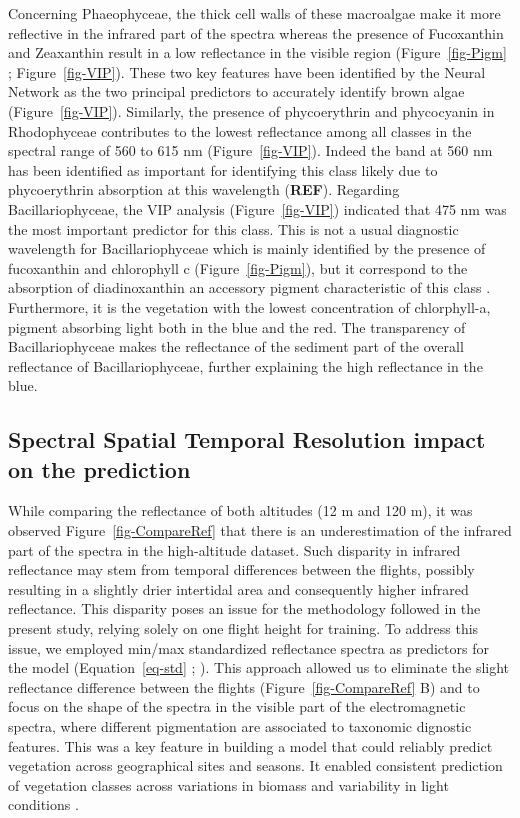 \documentclass[
  number]{elsarticle}
\begin{document}
Concerning Phaeophyceae, the thick cell walls of these macroalgae
\citep{charrier2021growth} make it more reflective in the infrared part
of the spectra \citep{Slaton2001} whereas the presence of Fucoxanthin
and Zeaxanthin result in a low reflectance in the visible region
(Figure~\ref{fig-Pigm} ; Figure~\ref{fig-VIP}). These two key features
have been identified by the Neural Network as the two principal
predictors to accurately identify brown algae (Figure~\ref{fig-VIP}).
Similarly, the presence of phycoerythrin and phycocyanin in Rhodophyceae
contributes to the lowest reflectance among all classes in the spectral
range of 560 to 615 nm (Figure~\ref{fig-VIP}). Indeed the band at 560 nm
has been identified as important for identifying this class likely due
to phycoerythrin absorption at this wavelength (\textbf{REF}). Regarding
Bacillariophyceae, the VIP analysis (Figure~\ref{fig-VIP}) indicated
that 475 nm was the most important predictor for this class. This is not
a usual diagnostic wavelength for Bacillariophyceae which is mainly
identified by the presence of fucoxanthin and chlorophyll c
(Figure~\ref{fig-Pigm}), but it correspond to the absorption of
diadinoxanthin an accessory pigment characteristic of this class
\citep{meleder2003spectrometric}. Furthermore, it is the vegetation with
the lowest concentration of chlorphyll-a, pigment absorbing light both
in the blue and the red. The transparency of Bacillariophyceae makes the
reflectance of the sediment part of the overall reflectance of
Bacillariophyceae, further explaining the high reflectance in the blue.

\subsection{Spectral Spatial Temporal Resolution impact on the
prediction}\label{spectral-spatial-temporal-resolution-impact-on-the-prediction}

While comparing the reflectance of both altitudes (12 m and 120 m), it
was observed Figure~\ref{fig-CompareRef} that there is an
underestimation of the infrared part of the spectra in the high-altitude
dataset. Such disparity in infrared reflectance may stem from temporal
differences between the flights, possibly resulting in a slightly drier
intertidal area and consequently higher infrared reflectance. This
disparity poses an issue for the methodology followed in the present
study, relying solely on one flight height for training. To address this
issue, we employed min/max standardized reflectance spectra as
predictors for the model (Equation~\ref{eq-std} ; \citep{Cao2017}). This
approach allowed us to eliminate the slight reflectance difference
between the flights (Figure~\ref{fig-CompareRef} B) and to focus on the
shape of the spectra in the visible part of the electromagnetic spectra,
where different pigmentation are associated to taxonomic dignostic
features. This was a key feature in building a model that could reliably
predict vegetation across geographical sites and seasons. It enabled
consistent prediction of vegetation classes across variations in biomass
and variability in light conditions \citetext{\citealp[
]{fyfe2003spatial}; \citealp[
]{COSTA2021107018}; \citealp{piaser2023impact}}.
\end{document}
